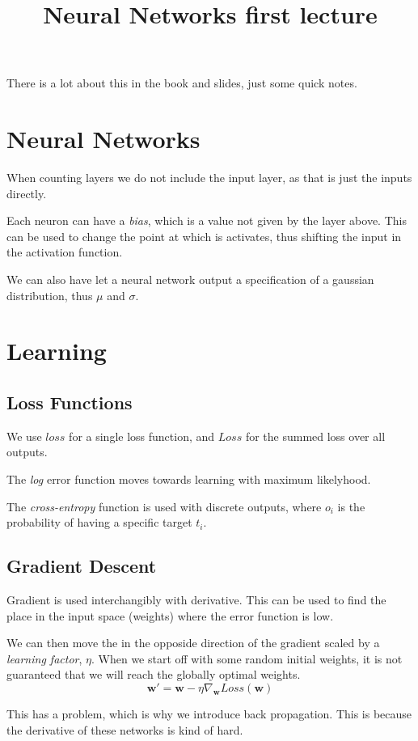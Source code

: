 \title{Neural Networks first lecture}

There is a lot about this in the book and slides, just some quick notes.

\section{Neural Networks}

When counting layers we do not include the input layer, as that is just the inputs directly.

Each neuron can have a \emph{bias}, which is a value not given by the layer above.
This can be used to change the point at which is activates, thus shifting the input in the activation function.

We can also have let a neural network output a specification of a gaussian distribution, thus $\mu$ and $\sigma$.

\section{Learning}

\subsection{Loss Functions}

We use $loss$ for a single loss function, and $Loss$ for the summed loss over all outputs.

The \emph{log} error function moves towards learning with maximum likelyhood.

The \emph{cross-entropy} function is  used with discrete outputs, where $o_i$ is the probability of having a specific target $t_i$.

\subsection{Gradient Descent}

Gradient is used interchangibly with derivative.
This can be used to find the place in the input space (weights) where the error function is low.

We can then move the in the opposide direction of the gradient scaled by a \emph{learning factor}, $\eta$.
When we start off with some random initial weights, it is not guaranteed that we will reach the globally optimal weights.
\[
    \mathbf{w}' = \mathbf{w} - \eta \nabla_{\mathbf{w}} Loss(\mathbf{w})
\]

This has a problem, which is why we introduce back propagation.
This is because the derivative of these networks is kind of hard.

